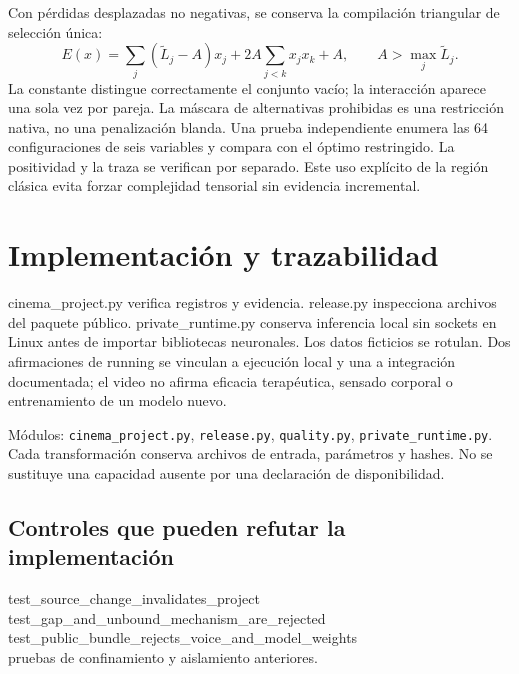\documentclass[10pt,a4paper]{article}
\begin{document}
Con pérdidas desplazadas no negativas, se conserva la compilación triangular de selección única:
\begin{equation}
E(x)=\sum_j(\widetilde L_j-A)x_j+2A\sum_{j<k}x_jx_k+A,\qquad A>\max_j\widetilde L_j.
\end{equation}
La constante distingue correctamente el conjunto vacío; la interacción aparece una sola vez por pareja. La máscara de alternativas prohibidas es una restricción nativa, no una penalización blanda. Una prueba independiente enumera las 64 configuraciones de seis variables y compara con el óptimo restringido. La positividad y la traza se verifican por separado. Este uso explícito de la región clásica evita forzar complejidad tensorial sin evidencia incremental.
\section{Implementación y trazabilidad}
cinema\_\allowbreak{}project.py verifica registros y evidencia. release.py inspecciona archivos del paquete público. private\_\allowbreak{}runtime.py conserva inferencia local sin sockets en Linux antes de importar bibliotecas neuronales. Los datos ficticios se rotulan. Dos afirmaciones de running se vinculan a ejecución local y una a integración documentada; el video no afirma eficacia terapéutica, sensado corporal o entrenamiento de un modelo nuevo.

Módulos: \texttt{cinema\_\allowbreak{}project.py}, \texttt{release.py}, \texttt{quality.py}, \texttt{private\_\allowbreak{}runtime.py}. Cada transformación conserva archivos de entrada, parámetros y hashes. No se sustituye una capacidad ausente por una declaración de disponibilidad.
\subsection{Controles que pueden refutar la implementación}
\begin{flushleft}\small test\_\allowbreak{}source\_\allowbreak{}change\_\allowbreak{}invalidates\_\allowbreak{}project\\ test\_\allowbreak{}gap\_\allowbreak{}and\_\allowbreak{}unbound\_\allowbreak{}mechanism\_\allowbreak{}are\_\allowbreak{}rejected\\ test\_\allowbreak{}public\_\allowbreak{}bundle\_\allowbreak{}rejects\_\allowbreak{}voice\_\allowbreak{}and\_\allowbreak{}model\_\allowbreak{}weights\\ pruebas de confinamiento y aislamiento anteriores.\end{flushleft}
\end{document}
